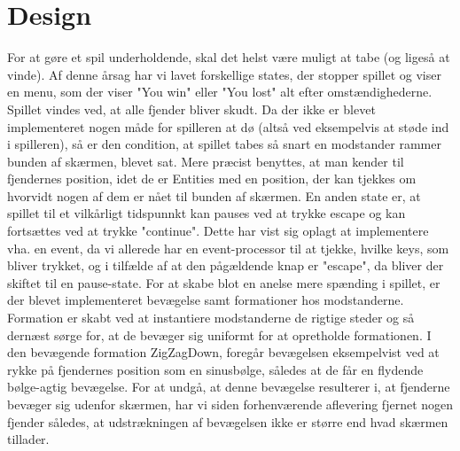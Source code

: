 \section{Design}

For at gøre et spil underholdende, skal det helst være muligt at tabe (og ligeså at vinde). Af denne årsag har vi lavet forskellige states, der stopper spillet og viser en menu, som der viser "You win" eller "You lost" alt efter omstændighederne. Spillet vindes ved, at alle fjender bliver skudt.
Da der ikke er blevet implementeret nogen måde for spilleren at dø (altså ved eksempelvis at støde ind i spilleren), så er den condition, at spillet tabes så snart en modstander rammer bunden af skærmen, blevet sat. Mere præcist benyttes, at man kender til fjendernes position, idet de er Entities med en position, der kan tjekkes om hvorvidt nogen af dem er nået til bunden af skærmen.
En anden state er, at spillet til et vilkårligt tidspunnkt kan pauses ved at trykke escape og kan fortsættes ved at trykke "continue". Dette har vist sig oplagt at implementere vha. en event, da vi allerede har en event-processor til at tjekke, hvilke keys, som bliver trykket, og i tilfælde af at den pågældende knap er "escape", da bliver der skiftet til en pause-state.
For at skabe blot en anelse mere spænding i spillet, er der blevet implementeret bevægelse samt formationer hos modstanderne. Formation er skabt ved at instantiere modstanderne de rigtige steder og så dernæst sørge for, at de bevæger sig uniformt for at opretholde formationen. I den bevægende formation ZigZagDown, foregår bevægelsen eksempelvist ved at rykke på fjendernes position som en sinusbølge, således at de får en flydende bølge-agtig bevægelse. For at undgå, at denne bevægelse resulterer i, at fjenderne bevæger sig udenfor skærmen, har vi siden forhenværende aflevering fjernet nogen fjender således, at udstrækningen af bevægelsen ikke er større end hvad skærmen tillader. 
